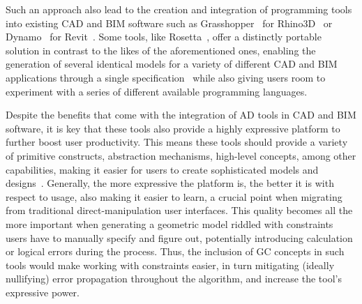 Such an approach also lead to the creation and integration of programming tools
into existing \ac{CAD} and \ac{BIM} software such as
Grasshopper~\cite{Rutten:2018:Grasshopper} for
Rhino3D~\cite{McNeel:2018:Rhinoceros3D} or Dynamo~\cite{Keough:2012:Dynamo} for
Revit~\cite{RevitTechCorp:2002:Revit}.  Some tools, like
Rosetta~\cite{Leitao:2011:PGDCAD}, offer a distinctly portable solution in
contrast to the likes of the aforementioned ones, enabling the generation of
several identical models for a variety of different \ac{CAD} and \ac{BIM}
applications through a single specification~\cite{CasteloBranco:2017:IAD} while
also giving users room to experiment with a series of different available
programming languages.

Despite the benefits that come with the integration of \ac{AD} tools in \ac{CAD}
and \ac{BIM} software, it is key that these tools also provide a highly
expressive platform to further boost user productivity.  This means these tools
should provide a variety of primitive constructs, abstraction mechanisms,
high-level concepts, among other capabilities, making it easier for users to
create sophisticated models and designs~\cite{Leitao:2014:IGDAGHOP}.  Generally,
the more expressive the platform is, the better it is with respect to usage,
also making it easier to learn, a crucial point when migrating from traditional
direct-manipulation user interfaces.  This quality becomes all the more
important when generating a geometric model riddled with constraints users have
to manually specify and figure out, potentially introducing calculation or
logical errors during the process.  Thus, the inclusion of \ac{GC} concepts in
such tools would make working with constraints easier, in turn mitigating
(ideally nullifying) error propagation throughout the algorithm, and increase
the tool's expressive power.

